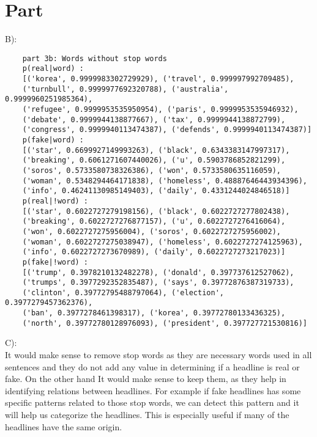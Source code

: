 \documentclass{article}
\newcommand{\enterProblemHeader}[1]{
}
\newcommand{\exitProblemHeader}[1]{
}
\newcounter{homeworkPartCounter} %
\newcommand{\homeworkPartName}{}
\newenvironment{homeworkPart}[1][Part \arabic{homeworkPartCounter}]{ %
\stepcounter{homeworkPartCounter} %
\renewcommand{\homeworkPartName}{#1} %
\section{\homeworkPartName} %
\enterProblemHeader{\homeworkPartName} %
}{
\exitProblemHeader{\homeworkPartName} %
}
\begin{document}
\begin{homeworkPart}
B):\\
\begin{verbatim}
    part 3b: Words without stop words
    p(real|word) :
    [('korea', 0.9999983302729929), ('travel', 0.999997992709485), 
    ('turnbull', 0.9999977692320788), ('australia', 0.9999960251985364), 
    ('refugee', 0.9999953535950954), ('paris', 0.9999953535946932), 
    ('debate', 0.9999944138877667), ('tax', 0.9999944138872799), 
    ('congress', 0.9999940113474387), ('defends', 0.9999940113474387)]
    p(fake|word) :
    [('star', 0.6699927149993263), ('black', 0.6343383147997317), 
    ('breaking', 0.6061271607440026), ('u', 0.5903786852821299), 
    ('soros', 0.5733580738326386), ('won', 0.5733580635116059), 
    ('woman', 0.5348294464171838), ('homeless', 0.48887646443934396), 
    ('info', 0.46241130985149403), ('daily', 0.4331244024846518)]
    p(real|!word) :
    [('star', 0.6022727279198156), ('black', 0.6022727277802438), 
    ('breaking', 0.6022727276877157), ('u', 0.6022727276416064), 
    ('won', 0.6022727275956004), ('soros', 0.6022727275956002), 
    ('woman', 0.6022727275038947), ('homeless', 0.6022727274125963), 
    ('info', 0.6022727273670989), ('daily', 0.6022727273217023)]
    p(fake|!word) :
    [('trump', 0.3978210132482278), ('donald', 0.397737612527062), 
    ('trumps', 0.3977292352835487), ('says', 0.39772876387319733), 
    ('clinton', 0.39772795488797064), ('election', 0.3977279457362376), 
    ('ban', 0.3977278461398317), ('korea', 0.39772780133436325), 
    ('north', 0.39772780128976093), ('president', 0.397727721530816)]
\end{verbatim}

C):\\
It would make sense to remove stop words as they are necessary words used in all sentences and they do not add any value in determining if a headline is real or fake. On the other hand It would make sense to keep them, as they help in identifying relations between headlines. For example if fake headlines has some specific patterns related to those stop words, we can detect this pattern and it will help us categorize the headlines. This is especially useful if many of the headlines have the same origin.

\end{homeworkPart}

\clearpage
\end{document}
